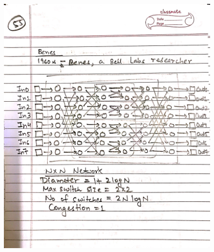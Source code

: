 \begin{figure}[H]
    \centering
    \includegraphics[width=16cm, height=21cm]{"./MIT-6.042J/MIT-6042J-055"}
\end{figure}
\newpage
